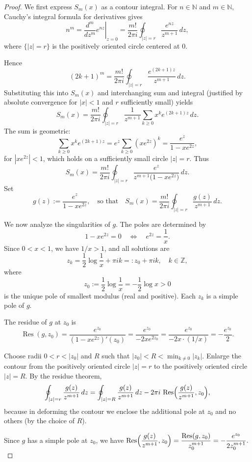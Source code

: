 \documentclass[12pt,twoside]{article}
\begin{document}
\begin{proof}
We first express $S_m(x)$ as a contour integral. For $n\in\mathbb{N}$ and $m\in\mathbb{N}$, Cauchy’s integral formula for derivatives gives
\[
n^m
= \left.\frac{d^m}{dz^m} e^{nz}\right|_{z=0}
= \frac{m!}{2\pi i} \oint_{|z|=r} \frac{e^{nz}}{z^{m+1}}\,dz,
\]
where $\{|z|=r\}$ is the positively oriented circle centered at $0$.

Hence
\[
(2k+1)^m
= \frac{m!}{2\pi i} \oint_{|z|=r} \frac{e^{(2k+1)z}}{z^{m+1}}\,dz.
\]
Substituting this into $S_m(x)$ and interchanging sum and integral (justified by absolute convergence for $|x|<1$ and $r$ sufficiently small) yields
\[
S_m(x)
= \frac{m!}{2\pi i} \oint_{|z|=r} \frac{1}{z^{m+1}}
   \sum_{k\ge 0} x^k e^{(2k+1)z}\,dz.
\]
The sum is geometric:
\[
\sum_{k\ge 0} x^k e^{(2k+1)z}
= e^z \sum_{k\ge 0} (x e^{2z})^k
= \frac{e^z}{1 - x e^{2z}},
\]
for $|x e^{2z}|<1$, which holds on a sufficiently small circle $|z|=r$. Thus
\[
S_m(x)
= \frac{m!}{2\pi i} \oint_{|z|=r}
  \frac{e^z}{z^{m+1} \bigl(1-x e^{2z}\bigr)}\,dz.
\]
Set
\[
g(z) := \frac{e^z}{1 - x e^{2z}},
\quad\text{so that}\quad
S_m(x) = \frac{m!}{2\pi i} \oint_{|z|=r} \frac{g(z)}{z^{m+1}}\,dz.
\]

We now analyze the singularities of $g$. The poles are determined by
\[
1 - x e^{2z} = 0
\quad\Longleftrightarrow\quad
e^{2z} = \frac{1}{x}.
\]
Since $0<x<1$, we have $1/x>1$, and all solutions are
\[
z_k = \frac{1}{2}\log\frac{1}{x} + \pi i k
    =: z_0 + \pi i k,\quad k\in\mathbb{Z},
\]
where
\[
z_0 := \frac{1}{2}\log\frac{1}{x} = -\frac{1}{2}\log x > 0
\]
is the unique pole of smallest modulus (real and positive). Each $z_k$ is a simple pole of $g$.

The residue of $g$ at $z_0$ is
\[
\operatorname{Res}(g,z_0)
= \frac{e^{z_0}}{(1 - x e^{2z})'(z_0)}
= \frac{e^{z_0}}{-2x e^{2z_0}}
= \frac{e^{z_0}}{-2x\cdot (1/x)}
= -\frac{e^{z_0}}{2}.
\]

Choose radii $0<r<|z_0|$ and $R$ such that
\(\displaystyle
|z_0| < R < \min_{k\ne 0} |z_k|.
\)
Enlarge the contour from the positively oriented circle $|z|=r$ to the positively oriented circle $|z|=R$. By the residue theorem,
\[
\oint_{|z|=r}\frac{g(z)}{z^{m+1}}\,dz
= \oint_{|z|=R}\frac{g(z)}{z^{m+1}}\,dz
  - 2\pi i\,\operatorname{Res}\Bigl(\frac{g(z)}{z^{m+1}}, z_0\Bigr),
\]
because in deforming the contour we enclose the additional pole at $z_0$ and no others (by the choice of $R$).

Since $g$ has a simple pole at $z_0$, we have
\(\displaystyle
\operatorname{Res}\Bigl(\frac{g(z)}{z^{m+1}}, z_0\Bigr)
= \frac{\operatorname{Res}(g,z_0)}{z_0^{m+1}}
= -\frac{e^{z_0}}{2 z_0^{m+1}}.
\)


\end{proof}
\end{document}
